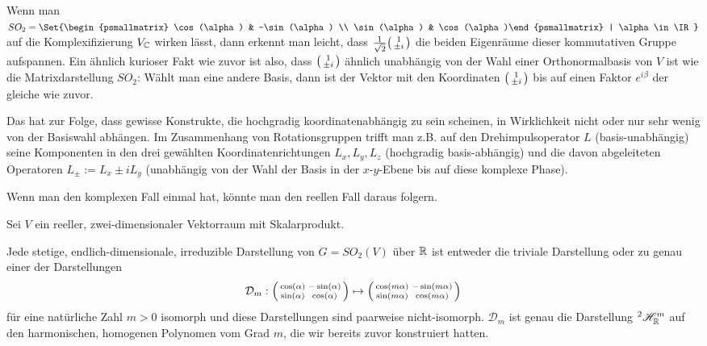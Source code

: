 \begin{remark}
Wenn man $SO_2=\Set{\begin{psmallmatrix} \cos(\alpha) & -\sin(\alpha) \\ \sin(\alpha) & \cos(\alpha)\end{psmallmatrix} | \alpha\in\IR}$ auf die Komplexifizierung $V_{\mathbb{C}}$ wirken lässt, dann erkennt man leicht, dass $\frac{1}{\sqrt{2}}\begin{psmallmatrix} 1 \\ \pm i\end{psmallmatrix}$ die beiden Eigenräume dieser kommutativen Gruppe aufspannen. Ein ähnlich kurioser Fakt wie zuvor ist also, dass $\begin{psmallmatrix} 1 \\ \pm i\end{psmallmatrix}$ ähnlich unabhängig von der Wahl einer Orthonormalbasis von $V$ ist wie die Matrixdarstellung $SO_2$: Wählt man eine andere Basis, dann ist der Vektor mit den Koordinaten $\begin{psmallmatrix} 1 \\ \pm i\end{psmallmatrix}$ bis auf einen Faktor $e^{i\beta}$ der gleiche wie zuvor.

\smallbreak
Das hat zur Folge, dass gewisse Konstrukte, die hochgradig koordinatenabhängig zu sein scheinen, in Wirklichkeit nicht oder nur sehr wenig von der Basiswahl abhängen. Im Zusammenhang von Rotationsgruppen trifft man z.B. auf den Drehimpulsoperator $L$ (basis-unabhängig) seine Komponenten in den drei gewählten Koordinatenrichtungen $L_x,L_y,L_z$ (hochgradig basis-abhängig) und die davon abgeleiteten Operatoren $L_{\pm} := L_x \pm i L_y$ (unabhängig von der Wahl der Basis in der $x$-$y$-Ebene bis auf diese komplexe Phase).
\end{remark}

\begin{remark}
Wenn man den komplexen Fall einmal hat, könnte man den reellen Fall daraus folgern.
\end{remark}

\begin{corollary}[Darstellungstheorie von $SO_2$ über $\IK=\IR$]
Sei $V$ ein reeller, zwei-dimensionaler Vektorraum mit Skalarprodukt.

Jede stetige, endlich-dimensionale, irreduzible Darstellung von $G=SO_2(V)$ über $\mathbb{R}$ ist entweder die triviale Darstellung oder zu genau einer der Darstellungen
\[\mathcal{D}_m : \begin{psmallmatrix}\cos(\alpha)&-\sin(\alpha)\\\sin(\alpha)&\cos(\alpha)\end{psmallmatrix} \mapsto \begin{psmallmatrix}\cos(m\alpha)&-\sin(m\alpha)\\\sin(m\alpha)&\cos(m\alpha)\end{psmallmatrix}\]
für eine natürliche Zahl $m>0$ isomorph und diese Darstellungen sind paarweise nicht-isomorph. $\mathcal{D}_m$ ist genau die Darstellung ${^2}\mathscr{H}_{\mathbb{R}}^m$ auf den harmonischen, homogenen Polynomen vom Grad $m$, die wir bereits zuvor konstruiert hatten.
\end{corollary}

